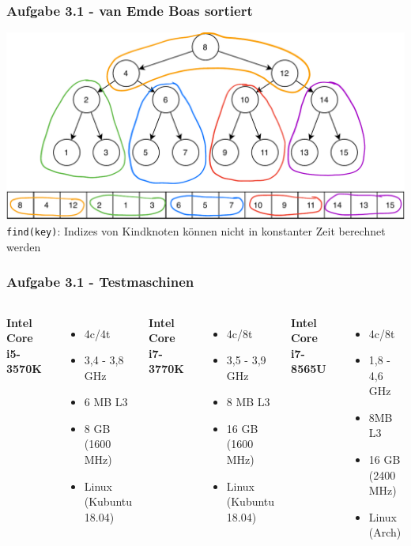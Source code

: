 \documentclass[aspectratio=169]{beamer}
\begin{document}
\begin{frame}
	\frametitle{Aufgabe 3.1 - van Emde Boas sortiert}
	
	
	\begin{center}
		\includegraphics[scale=.6]{veb_layout.pdf}\\
		\centering \texttt{find(key)}: Indizes von Kindknoten können nicht in konstanter Zeit berechnet werden	
	\end{center}
	\end{frame}

\begin{frame}
\frametitle{Aufgabe 3.1 - Testmaschinen}
\begin{columns}[c] %
	
	\textbf{Intel Core i5-3570K}
	\begin{itemize}
		\item 4c/4t
		\item 3,4 - 3,8 GHz
		\item 6 MB L3
		\item 8 GB (1600 MHz)
		\item Linux (Kubuntu 18.04)
		
	\end{itemize}
	
	\textbf{Intel Core i7-3770K}
	\begin{itemize}
		\item 4c/8t
		\item 3,5 - 3,9 GHz
		\item 8 MB L3
		\item 16 GB (1600 MHz)
		\item Linux (Kubuntu 18.04)
		
	\end{itemize}
	

	\textbf{Intel Core i7-8565U}
	\begin{itemize}
		\item 4c/8t
		\item 1,8 - 4,6 GHz
		\item 8MB L3
		\item 16 GB (2400 MHz)
		\item Linux (Arch)
	\end{itemize}

\end{columns}
\end{frame}
\end{document}
